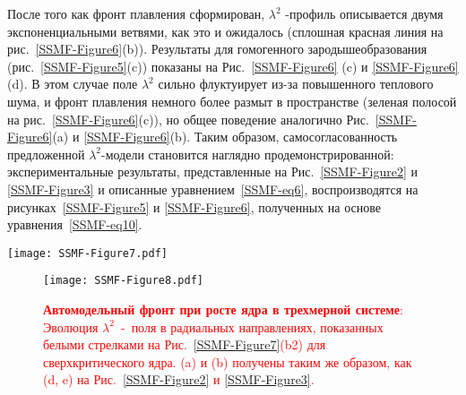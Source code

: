 После того как фронт плавления сформирован, $\lambda^2$ -профиль описывается двумя экспоненциальными ветвями, как это и ожидалось (сплошная красная линия на рис.~\ref{SSMF-Figure6}(b)).
Результаты для гомогенного зародышеобразования (рис.~\ref{SSMF-Figure5}(c)) показаны на Рис.~\ref{SSMF-Figure6} (c) и \ref{SSMF-Figure6}(d).
В этом случае поле $\lambda^2$ сильно флуктуирует из-за повышенного теплового шума, и фронт плавления немного более размыт в пространстве (зеленая полосой на рис.~\ref{SSMF-Figure6}(c)), но общее поведение аналогично Рис.~\ref{SSMF-Figure6}(a) и \ref{SSMF-Figure6}(b).
Таким образом, самосогласованность предложенной $\lambda^2$-модели становится наглядно продемонстрированной: экспериментальные результаты, представленные на Рис.~\ref{SSMF-Figure2} и \ref{SSMF-Figure3} и описанные уравнением~\eqref{SSMF-eq6}, воспроизводятся на рисунках~\ref{SSMF-Figure5} и \ref{SSMF-Figure6}, полученных на основе уравнения~\eqref {SSMF-eq10}.

\begin{figure*}[!t]
\centering
\texttt{[image: SSMF-Figure7.pdf]}
 \caption{\textcolor{red}{\textbf{Эволюция различных начальных трехмерных (сферических) $\lambda^2$~-~флуктуаций (ядер) и спонтанное зарождение в однородной системе}:
Последовательные кадры иллюстрируют эволюцию (a) докритической и (b) сверхкритической $\lambda^2$ -флуктуации (ядра) и спонтанное зарождение ядра из-за теплового шума.}}
\label{SSMF-Figure7}
\end{figure*}

\begin{figure}[!t]
\centering
\texttt{[image: SSMF-Figure8.pdf]}
 \caption{\textcolor{red}{\textbf{Автомодельный фронт при росте ядра в трехмерной системе}:
Эволюция $\lambda^2$~-~поля в радиальных направлениях, показанных белыми стрелками на Рис.~\ref{SSMF-Figure7}(b2) для сверхкритического ядра.
(a) и (b) получены таким же образом, как (d, e) на Рис.~\ref{SSMF-Figure2} и \ref{SSMF-Figure3}.}}
\label{SSMF-Figure8}
\end{figure}

